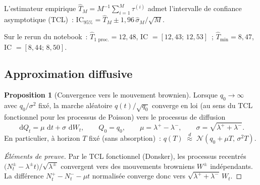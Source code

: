 \documentclass[11pt,a4paper]{article}
\theoremstyle{definition}
\newtheorem{proposition}{Proposition}[section]
\newcommand{\dif}{\,\mathrm{d}}
\begin{document}
L'estimateur empirique $\widehat T_M = M^{-1}\sum_{i=1}^M \tau^{(i)}$ admet
l'intervalle de confiance asymptotique (TCL)~:
$\mathrm{IC}_{95\%} = \widehat T_M \pm 1{,}96\,\hat\sigma_M/\sqrt M$.

Sur le rerun du notebook~: $\widehat T_{\text{1 proc.}}=12{,}48$,
IC $=[12{,}43;\,12{,}53]$~; $\widehat T_{\min}=8{,}47$,
IC $=[8{,}44;\,8{,}50]$.

\subsection{Approximation diffusive}
\label{sec:diffusion}

\begin{proposition}[Convergence vers le mouvement brownien]
\label{prop:bm}
Lorsque $q_0\to\infty$ avec $q_0/\sigma^2$ fixé, la marche aléatoire
$q(t)/\sqrt{q_0}$ converge en loi (au sens du TCL fonctionnel pour les
processus de Poisson) vers le processus de diffusion
\[
  \dif Q_t = \mu\,\dif t + \sigma\,\dif W_t,
  \qquad Q_0 = q_0,
  \qquad \mu = \lambda^+-\lambda^-,
  \qquad \sigma = \sqrt{\lambda^++\lambda^-}.
\]
En particulier, à horizon $T$ fixé (sans absorption)~:
$q(T) \;\overset{d}{\approx}\; \mathcal{N}(q_0+\mu T,\,\sigma^2 T)$.
\end{proposition}

\begin{proof}[Éléments de preuve]
Par le TCL fonctionnel (Donsker), les processus recentrés
$\bigl(N^\pm_t-\lambda^\pm t\bigr)/\sqrt{\lambda^\pm}$ convergent vers des
mouvements browniens $W^\pm$ indépendants. La différence $N^+_t-N^-_t-\mu t$
normalisée converge donc vers $\sqrt{\lambda^++\lambda^-}\,W_t$.
\end{proof}
\end{document}
